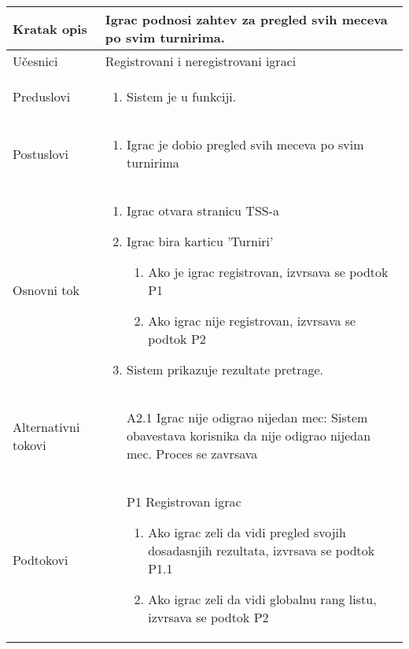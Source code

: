 \documentclass{article}
\begin{document}
\begin{longtable}{| p{} | p{} |} 
\hline
    Kratak opis & Igrac podnosi zahtev za pregled svih meceva po svim turnirima.\\ 
\hline    
    Učesnici & Registrovani i neregistrovani igraci
    \\
\hline
   Preduslovi & \begin{enumerate}
       \item Sistem je u funkciji.
   \end{enumerate}\\
\hline  
    Postuslovi & \begin{enumerate}
        \item Igrac je dobio pregled svih meceva po svim turnirima
    \end{enumerate}\\
\hline
    Osnovni tok & \begin{enumerate}
        \item Igrac otvara stranicu TSS-a
        \item Igrac bira karticu 'Turniri'
            \begin{enumerate}
                \item Ako je igrac registrovan, izvrsava se podtok
                P1
                \item Ako igrac nije registrovan, izvrsava se podtok P2
            \end{enumerate}
        \item Sistem prikazuje rezultate pretrage.
    \end{enumerate}\\
\hline
    Alternativni tokovi & \begin{itemize}
        \item[A2.1] Igrac nije odigrao nijedan mec: Sistem obavestava korisnika da nije odigrao nijedan mec. Proces se zavrsava
    \end{itemize}\\
\hline
    Podtokovi & \begin{itemize}
        \item [P1] Registrovan igrac
            \begin{enumerate}
                \item Ako igrac zeli da vidi pregled svojih dosadasnjih rezultata, izvrsava se podtok P1.1
                \item Ako igrac zeli da vidi globalnu rang listu, izvrsava se podtok P2

\end{enumerate}
\end{itemize}
\end{longtable}
\end{document}
